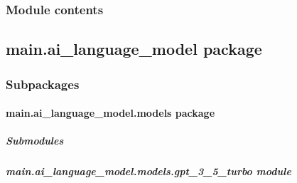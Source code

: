\documentclass[letterpaper,10pt,english]{sphinxmanual}
\begin{document}
\subsubsection{Module contents}
\label{\detokenize{main.ai_doxygen_cleaner:module-main.ai_doxygen_cleaner}}\label{\detokenize{main.ai_doxygen_cleaner:module-contents}}
\sphinxstepscope


\subsection{main.ai\_language\_model package}
\label{\detokenize{main.ai_language_model:main-ai-language-model-package}}\label{\detokenize{main.ai_language_model::doc}}

\subsubsection{Subpackages}
\label{\detokenize{main.ai_language_model:subpackages}}
\sphinxstepscope


\paragraph{main.ai\_language\_model.models package}
\label{\detokenize{main.ai_language_model.models:main-ai-language-model-models-package}}\label{\detokenize{main.ai_language_model.models::doc}}

\subparagraph{Submodules}
\label{\detokenize{main.ai_language_model.models:submodules}}

\subparagraph{main.ai\_language\_model.models.gpt\_3\_5\_turbo module}
\label{\detokenize{main.ai_language_model.models:module-main.ai_language_model.models.gpt_3_5_turbo}}\label{\detokenize{main.ai_language_model.models:main-ai-language-model-models-gpt-3-5-turbo-module}}
\end{document}
